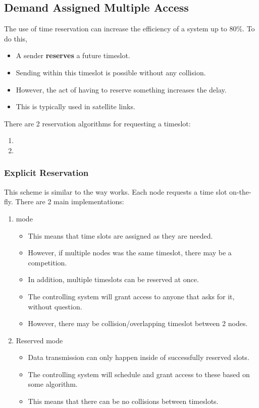 \subsection{Demand Assigned Multiple Access}\label{subsec:DAMA}
The use of time reservation can increase the efficiency of a system up to 80\%.
To do this,
\begin{itemize}[noitemsep]
\item A sender \textbf{reserves} a future timeslot.
\item Sending within this timeslot is possible without any collision.
\item However, the act of having to reserve something increases the delay.
\item This is typically used in satellite links.
\end{itemize}

There are 2 reservation algorithms for requesting a timeslot:
\begin{enumerate}[noitemsep]
\item {}
\item {}
\end{enumerate}

\subsubsection{Explicit Reservation}\label{subsubsec:TDMA_Explicit_Reservation}
This scheme is similar to the way  works.
Each node requests a time slot on-the-fly.
There are 2 main implementations:
\begin{enumerate}[noitemsep]
\item {} mode
  \begin{itemize}[noitemsep]
  \item This means that time slots are assigned as they are needed.
  \item However, if multiple nodes was the same timeslot, there may be a competition.
  \item In addition, multiple timeslots can be reserved at once.
  \item The controlling system will grant access to anyone that asks for it, without question.
  \item However, there may be collision/overlapping timeslot between 2 nodes.
  \end{itemize}

\item Reserved mode
  \begin{itemize}[noitemsep]
  \item Data transmission can only happen inside of successfully reserved slots.
  \item The controlling system will schedule and grant access to these based on some algorithm.
  \item This means that there can be no collisions between timeslots.
  \end{itemize}
\end{enumerate}

